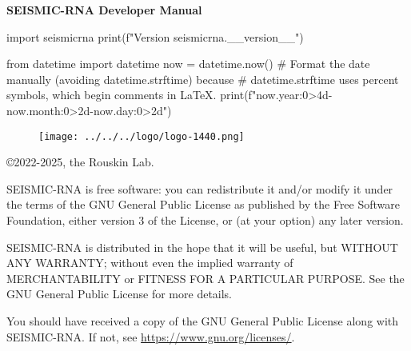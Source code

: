 \documentclass[main.tex]{subfiles}
\begin{document}
\begin{titlepage}


\begin{center}

\huge
\textbf{SEISMIC-RNA Developer Manual}
\normalsize

\vspace{0.5cm}

\Large
\begin{python}
import seismicrna
print(f"Version {seismicrna.__version__}")
\end{python}
\normalsize

\vspace{0.25cm}

\Large
\begin{python}
from datetime import datetime
now = datetime.now()
# Format the date manually (avoiding datetime.strftime) because
# datetime.strftime uses percent symbols, which begin comments in LaTeX.
print(f"{now.year:0>4d}-{now.month:0>2d}-{now.day:0>2d}")
\end{python}
\normalsize

\end{center}

\vspace{2cm}

\begin{figure}[h]
    \texttt{[image: ../../../logo/logo-1440.png]}
\end{figure}


\end{titlepage}


\pagebreak



\noindent
\copyright 2022-2025, the Rouskin Lab.

\vspace{0.25cm}

\noindent
SEISMIC-RNA is free software: you can redistribute it and/or modify it under
the terms of the GNU General Public License as published by the Free Software
Foundation, either version 3 of the License, or (at your option) any later
version.

\vspace{0.25cm}

\noindent
SEISMIC-RNA is distributed in the hope that it will be useful, but WITHOUT ANY
WARRANTY; without even the implied warranty of MERCHANTABILITY or FITNESS FOR A
PARTICULAR PURPOSE. See the GNU General Public License for more details.

\vspace{0.25cm}

\noindent
You should have received a copy of the GNU General Public License along with
SEISMIC-RNA. If not, see \url{https://www.gnu.org/licenses/}.


\pagebreak
\end{document}
